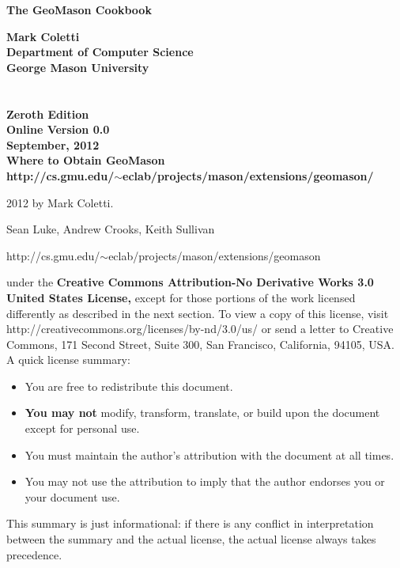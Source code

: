 \documentclass[twoside,10pt]{book}
\newcommand\reference[1]{\vspace{0.5em}\hfill{\parbox{6in}{\raggedleft\noindent\textsf{#1}}}}
\begin{document}
\begin{flushleft}
\huge\bf The GeoMason Cookbook\\[\baselineskip]
\end{flushleft}

\noindent\Large\bf Mark Coletti\\
{\large\rm 
Department of Computer Science\\
George Mason University}
\\
\\
\\
\Large\bf Zeroth Edition\\
\large\rm Online Version 0.0\\
\large\rm September, 2012\\

\vspace{5in}
\noindent\Large\bf Where to Obtain GeoMason\\
\large\rm http:/\!/cs.gmu.edu/\!\(\sim\)eclab/projects/mason/extensions/geomason/

\clearpage

\small 
{}  2012 by Mark Coletti.

\vspace{0.25in}
 Sean Luke, Andrew Crooks, Keith Sullivan

\vspace{0.25in}


\reference{http:/\!/cs.gmu.edu/\!\(\sim\)eclab/projects/mason/extensions/geomason}

\vspace{0.15in}

\vspace{0.15in}
	 under the {\bf Creative Commons Attribution-No Derivative Works 3.0 United States License,} except for those portions of the work licensed differently as described in the next section. To view a copy of this license, visit http:/\!/creativecommons.org/licenses/by-nd/3.0/us/ or send a letter to Creative Commons, 171 Second Street, Suite 300, San Francisco, California, 94105, USA.  A quick license summary:
	\begin{itemize}
	\item You are free to redistribute this document.
	\vspace{-0.5em}\item {\bf You may not} modify, transform, translate, or build upon the document except for personal use.   
	\vspace{-0.5em}\item You must maintain the author's attribution with the document at all times.
	\vspace{-0.5em}\item You may not use the attribution to imply that the author endorses you or your document use.  
	\end{itemize}
	This summary is just informational: if there is any conflict in interpretation between the summary and the actual license, the actual license always takes precedence.
\end{document}
